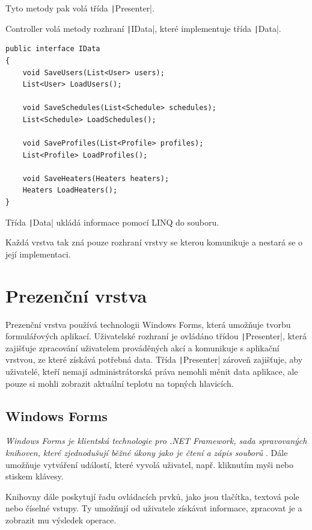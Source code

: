 \documentclass[thesis=B,czech]{FITthesis}[2012/10/20]
\begin{document}
Tyto metody pak volá třída \texttt|Presenter|.

Controller volá metody rozhraní \texttt|IData|, které implementuje třída \texttt|Data|. 

\newpage

\begin{verbatim}
public interface IData
{
    void SaveUsers(List<User> users);
    List<User> LoadUsers();

    void SaveSchedules(List<Schedule> schedules);
    List<Schedule> LoadSchedules();

    void SaveProfiles(List<Profile> profiles);
    List<Profile> LoadProfiles();

    void SaveHeaters(Heaters heaters);
    Heaters LoadHeaters();
}
\end{verbatim}

Třída \texttt|Data| ukládá informace pomocí LINQ do souboru.

Každá vrstva tak zná pouze rozhraní vrstvy se kterou komunikuje a nestará se o její implementaci.

\section{Prezenční vrstva}

Prezenční vrstva používá technologii Windows Forms, která umožňuje tvorbu formulářových aplikací. Uživatelské rozhraní je ovládáno třídou \texttt|Presenter|, která zajišťuje zpracování uživatelem prováděných akcí a komunikuje s aplikační vrstvou, ze které získává potřebná data. Třída \texttt|Presenter| zároveň zajišťuje, aby uživatelé, kteří nemají administrátorská práva nemohli měnit data aplikace, ale pouze si mohli zobrazit aktuální teplotu na topných hlavicích.

\subsection{Windows Forms}

\textit{
Windows Forms je klientská technologie pro .NET Framework, sada spravovaných knihoven, které zjednodušují běžné úkony jako je čtení a zápis souborů
} \cite{winForms}. Dále umožňuje vytváření událostí, které vyvolá uživatel, např. kliknutím myši nebo stiskem klávesy.

Knihovny dále poskytují řadu ovládacích prvků, jako jsou tlačítka, textová pole nebo číselné vstupy. Ty umožňují od uživatele získávat informace, zpracovat je a zobrazit mu výsledek operace.
\end{document}
